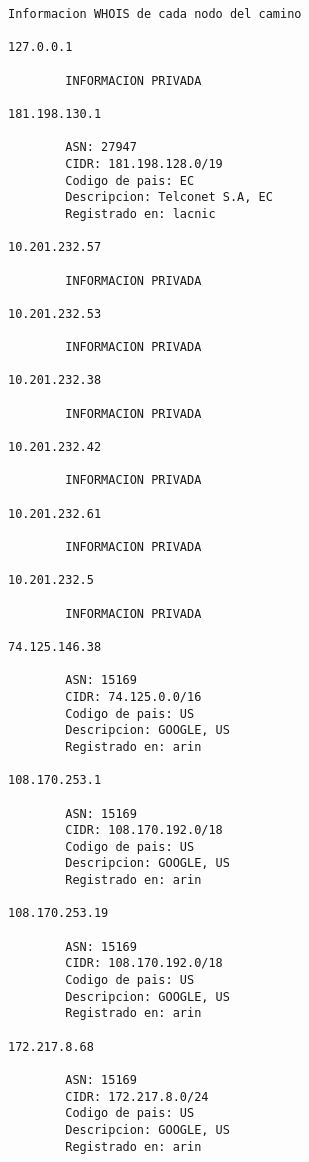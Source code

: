 \documentclass[11pt]{article}
\begin{document}
    \begin{Verbatim}[commandchars=\\\{\}]
Informacion WHOIS de cada nodo del camino

127.0.0.1

        INFORMACION PRIVADA

181.198.130.1

        ASN: 27947
        CIDR: 181.198.128.0/19
        Codigo de pais: EC
        Descripcion: Telconet S.A, EC
        Registrado en: lacnic

10.201.232.57

        INFORMACION PRIVADA

10.201.232.53

        INFORMACION PRIVADA

10.201.232.38

        INFORMACION PRIVADA

10.201.232.42

        INFORMACION PRIVADA

10.201.232.61

        INFORMACION PRIVADA

10.201.232.5

        INFORMACION PRIVADA

74.125.146.38

        ASN: 15169
        CIDR: 74.125.0.0/16
        Codigo de pais: US
        Descripcion: GOOGLE, US
        Registrado en: arin

108.170.253.1

        ASN: 15169
        CIDR: 108.170.192.0/18
        Codigo de pais: US
        Descripcion: GOOGLE, US
        Registrado en: arin

108.170.253.19

        ASN: 15169
        CIDR: 108.170.192.0/18
        Codigo de pais: US
        Descripcion: GOOGLE, US
        Registrado en: arin

172.217.8.68

        ASN: 15169
        CIDR: 172.217.8.0/24
        Codigo de pais: US
        Descripcion: GOOGLE, US
        Registrado en: arin

    \end{Verbatim}
\end{document}
